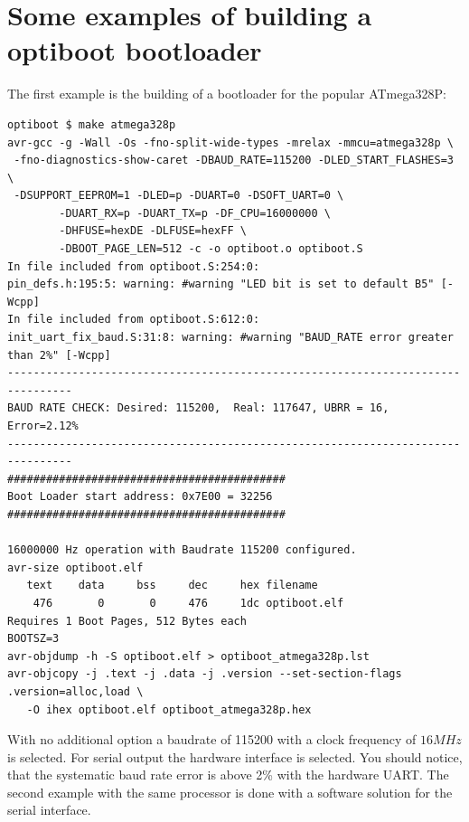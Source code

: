 \section{Some examples of building a optiboot bootloader}

The first example is the building of a bootloader for the popular ATmega328P:

\begin{verbatim}
optiboot $ make atmega328p
avr-gcc -g -Wall -Os -fno-split-wide-types -mrelax -mmcu=atmega328p \
 -fno-diagnostics-show-caret -DBAUD_RATE=115200 -DLED_START_FLASHES=3 \
 -DSUPPORT_EEPROM=1 -DLED=p -DUART=0 -DSOFT_UART=0 \
        -DUART_RX=p -DUART_TX=p -DF_CPU=16000000 \
        -DHFUSE=hexDE -DLFUSE=hexFF \
        -DBOOT_PAGE_LEN=512 -c -o optiboot.o optiboot.S
In file included from optiboot.S:254:0:
pin_defs.h:195:5: warning: #warning "LED bit is set to default B5" [-Wcpp]
In file included from optiboot.S:612:0:
init_uart_fix_baud.S:31:8: warning: #warning "BAUD_RATE error greater than 2%" [-Wcpp]
--------------------------------------------------------------------------------
BAUD RATE CHECK: Desired: 115200,  Real: 117647, UBRR = 16, Error=2.12%
--------------------------------------------------------------------------------
###########################################
Boot Loader start address: 0x7E00 = 32256
###########################################

16000000 Hz operation with Baudrate 115200 configured.
avr-size optiboot.elf
   text	   data	    bss	    dec	    hex	filename
    476	      0	      0	    476	    1dc	optiboot.elf
Requires 1 Boot Pages, 512 Bytes each
BOOTSZ=3
avr-objdump -h -S optiboot.elf > optiboot_atmega328p.lst
avr-objcopy -j .text -j .data -j .version --set-section-flags .version=alloc,load \
   -O ihex optiboot.elf optiboot_atmega328p.hex
\end{verbatim}


With no additional option a baudrate of 115200 with a clock frequency of \(16 MHz\) is selected.
For serial output the hardware interface is selected.
You should notice, that the systematic baud rate error is above 2\% with the hardware UART.
The second example with the same processor is done with a software solution for the serial interface.

